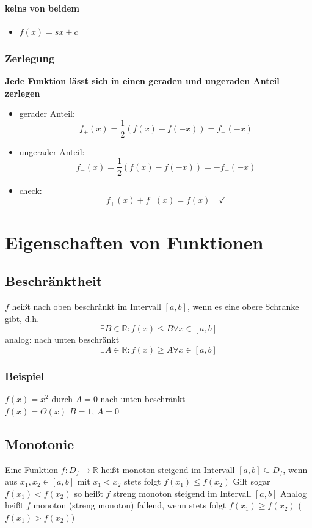 \documentclass[a4paper]{scrartcl}
\DeclareMathOperator{\Forall}{\forall}
\begin{document}
\paragraph{keins von beidem}
\label{sec-7-2-1-3}
\begin{itemize}
\item $f(x) = s x + c$
\end{itemize}
\subsubsection{Zerlegung}
\label{sec-7-2-2}

\textbf{Jede Funktion lässt sich in einen geraden und ungeraden Anteil zerlegen}
\begin{itemize}
\item gerader Anteil: \[f_+(x)=\frac{1}{2}\left(f(x) + f(-x)\right)=f_+(-x)\]
\item ungerader Anteil: \[f_-(x)=\frac{1}{2}\left(f(x)-f(-x)\right)=-f_-(-x)\]
\item check: \[f_+(x) + f_-(x)=f(x)\quad\checkmark\]
\end{itemize}
\section{Eigenschaften von Funktionen}
\label{sec-8}
\subsection{Beschränktheit}
\label{sec-8-1}
$f$ heißt nach oben beschränkt im Intervall $[a,b]$, wenn es eine obere Schranke gibt, d.h. \[\exists B\in\mathbb{R}: f(x)\leq B\Forall x\in [a,b]\]
analog: nach unten beschränkt \[\exists A\in\mathbb{R}: f(x)\geq A\Forall x\in [a,b]\]
\subsubsection{Beispiel}
\label{sec-8-1-1}
$f(x) = x^2$ durch $A=0$ nach unten beschränkt\\
        $f(x) = \Theta(x)$ $B=1$, $A=0$
\subsection{Monotonie}
\label{sec-8-2}
Eine Funktion $f:D_f\to\mathbb{R}$ heißt monoton steigend im Intervall $[a,b] \subseteq D_f$, wenn aus $x_1,x_2\in [a,b]$ mit $x_1<x_2$ stets folgt $f(x_1) \leq f(x_2)$
Gilt sogar $f(x_1) < f(x_2)$ so heißt $f$ streng monoton steigend im Intervall $[a,b]$
Analog heißt $f$ monoton (streng monoton) fallend, wenn stets folgt $f(x_1) \geq f(x_2)$ ($f(x_1) > f(x_2)$)
\end{document}
